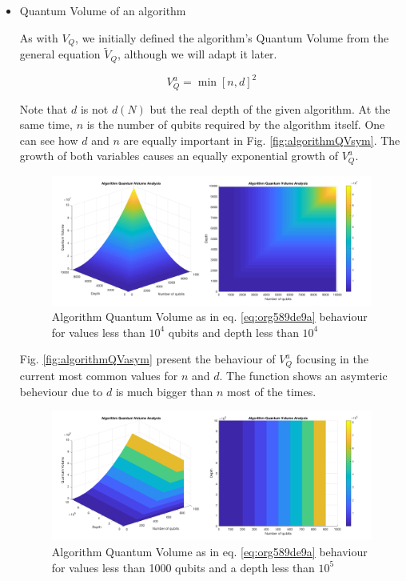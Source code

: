 \begin{itemize}
\begin{itemize}
\begin{itemize}
\item Quantum Volume of an algorithm
\label{sec:org8510706}

As with \(V_Q\), we initially defined the algorithm's Quantum Volume from the general equation \(\tilde{V}_Q\), although we will adapt it later.

\begin{equation}
\label{eq:org589de9a}
V_Q^a = \min \left[ n,d \right]^2
\end{equation}

Note that \(d\) is not \(d(N)\) but the real depth of the given algorithm.
At the same time, \(n\) is the number of qubits required by the algorithm itself.
One can see how \(d\) and \(n\) are equally important in Fig. \ref{fig:algorithmQVsym}.
The growth of both variables causes an equally exponential growth of \(V^a_Q\).

\begin{figure}[htbp]
\centering
\includegraphics[width=\textwidth]{figures/V_q_analysis_sym.png}
\caption{\label{fig:org9ce736c}
Algorithm Quantum Volume as in eq. \ref{eq:org589de9a} behaviour for values less than \(10^{4}\) qubits and depth less than \(10^{4}\)}
\end{figure}

Fig. \ref{fig:algorithmQVasym} present the behaviour of \(V_Q^a\)
focusing in the current most common values for \(n\) and \(d\).
The function shows an asymteric beheviour due to \(d\) is much bigger than \(n\) most of the times.


\begin{figure}[htbp]
\centering
\includegraphics[width=\textwidth]{figures/V_q_analysis_asym.png}
\caption{\label{fig:orgf9aa21a}
Algorithm Quantum Volume as in eq. \ref{eq:org589de9a} behaviour for values less than 1000 qubits and a depth less than \(10^{5}\)}
\end{figure}


\end{itemize}
\end{itemize}
\end{itemize}
